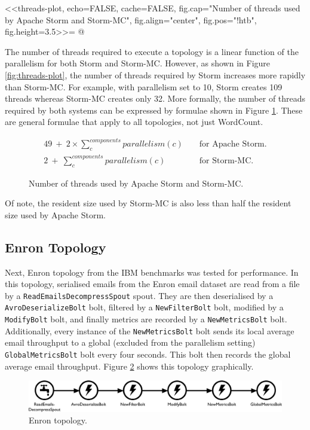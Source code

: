 <<threads-plot, echo=FALSE, cache=FALSE, fig.cap="Number of threads used by Apache Storm and Storm-MC", fig.align="center", fig.pos="!htb", fig.height=3.5>>=
@

The number of threads required to execute a topology is a linear function of the parallelism for both Storm and Storm-MC. However, as shown in Figure \ref{fig:threads-plot}, the number of threads required by Storm increases more rapidly than Storm-MC. For example, with parallelism set to 10, Storm creates 109 threads whereas Storm-MC creates only 32. More formally, the number of threads required by both systems can be expressed by formulae shown in Figure \ref{fig:formula}. These are general formulae that apply to all topologies, not just WordCount.

\begin{figure}[!htb]
\begin{eqnarray*}
	49 \ + \ 2 \times \sum\limits_{c}^{components} parallelism(c) && \text{ for Apache Storm.} \\
	2 \ + \ \sum\limits_{c}^{components} parallelism(c) && \text{ for Storm-MC.}
\end{eqnarray*}
\caption{Number of threads used by Apache Storm and Storm-MC.}
\label{fig:formula}
\end{figure}

Of note, the resident size used by Storm-MC is also less than half the resident size used by Apache Storm.

\subsection{Enron Topology}

Next, Enron topology from the IBM benchmarks was tested for performance. In this topology, serialised emails from the Enron email dataset are read from a file by a \texttt{ReadEmailsDecompressSpout} spout. They are then deserialised by a \texttt{AvroDeserializeBolt} bolt, filtered by a \texttt{NewFilterBolt} bolt, modified by a \texttt{ModifyBolt} bolt, and finally metrics are recorded by a \texttt{NewMetricsBolt} bolt. Additionally, every instance of the \texttt{NewMetricsBolt} bolt sends its local average email throughput to a global (excluded from the parallelism setting) \texttt{GlobalMetricsBolt} bolt every four seconds. This bolt then records the global average email throughput. Figure \ref{fig:enron_topology} shows this topology graphically.

\begin{figure}[!htb]
\begin{adjustwidth}{-0.5in}{-0.5in}
	\centering
	\includegraphics[scale=0.475]{pdf/enron_topology.pdf}
	\caption{Enron topology.}
	\label{fig:enron_topology}
\end{adjustwidth}
\end{figure}

